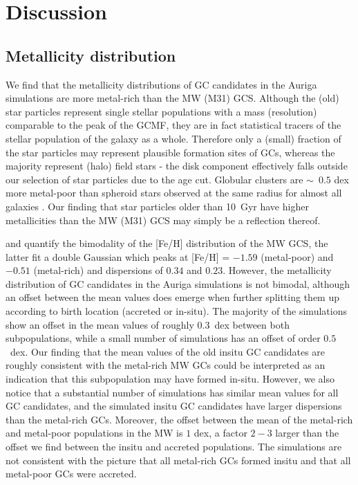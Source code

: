 \documentclass[a4paper,fleqn,usenatbib]{mnras}
\begin{document}
\section{Discussion}
\label{sec:discussion}
\subsection{Metallicity distribution}
\label{sec:discussion_FeH}
We find that the metallicity distributions of GC candidates in the Auriga
simulations are more metal-rich than the MW (M31) GCS. Although the (old) star 
particles represent single stellar populations with a mass (resolution) comparable 
to the peak of the GCMF, they are in fact statistical tracers of the stellar 
population of the galaxy as a whole. Therefore only a (small) fraction of the 
star particles may represent plausible formation sites of GCs, whereas the majority
represent (halo) field stars - the disk component effectively falls outside
our selection of star particles due to the age cut. Globular clusters are 
$\sim$~$0.5$ dex more metal-poor than spheroid stars observed at the same radius
for almost all galaxies \citep{1991ARA&A..29..543H}. Our finding that star particles older 
than 10~Gyr have higher metallicities than the MW (M31) GCS may simply be a 
reflection thereof.

\citet[][p. 234]{1998gcs..book.....A} and \citet[][p. 38]{Harris2001} quantify
the bimodality of the [Fe/H] distribution of the MW GCS, the latter fit a double
Gaussian which peaks at [Fe/H] = $-1.59$ (metal-poor) and $-0.51$ (metal-rich)
and dispersions of $0.34$ and $0.23$. However, the metallicity distribution of 
GC candidates in the Auriga simulations is not bimodal, although an offset between
the mean values does emerge when further splitting them up according to birth location 
(accreted or in-situ). The majority of the simulations show an offset in the mean 
values of roughly $0.3$~dex between both subpopulations, while a small number of 
simulations has an offset of order $0.5$~dex. Our finding that the mean values of 
the old insitu GC candidates are roughly consistent with the metal-rich MW GCs 
could be interpreted as an indication that this subpopulation may have formed 
in-situ. However, we also notice that a substantial number of simulations has
similar mean values for all GC candidates, and the simulated insitu GC candidates 
have larger dispersions than the metal-rich GCs. Moreover, the offset between the 
mean of the metal-rich and metal-poor populations in the MW is $1$ dex, a factor 
$2-3$ larger than the offset we find between the insitu and accreted populations. 
The simulations are not consistent with the picture that all metal-rich GCs 
formed insitu and that all metal-poor GCs were accreted.
\end{document}
